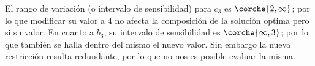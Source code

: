 \begin{homeworkProblem}[-1][Gran M...]
El rango de variación (o intervalo de sensibilidad) para $c_3$ es $\corche{2,\infty}$; por lo que modificar su valor a 4 no afecta la composición de la solución optima pero si su valor.
En cuanto a $b_3$, su intervalo de sensibilidad es $\corche{\infty,3}$; por lo que también se halla dentro del mismo el nuevo valor. Sin embargo la nueva restricción resulta redundante, por lo que no nos es posible evaluar la misma. 
\end{homeworkProblem}